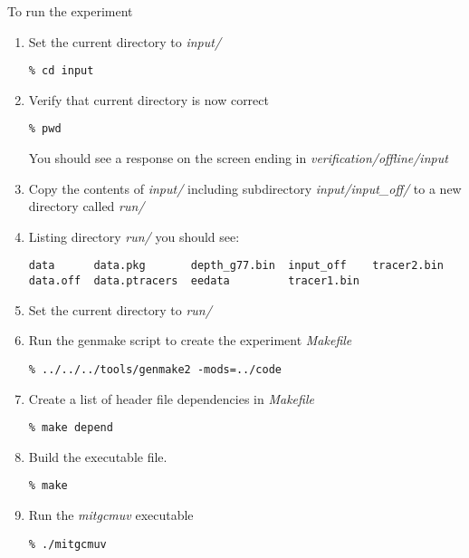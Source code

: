 To run the experiment

\begin{enumerate}
\item Set the current directory to {\it input/ }

\begin{verbatim}
% cd input
\end{verbatim}

\item Verify that current directory is now correct

\begin{verbatim}
% pwd
\end{verbatim}

  You should see a response on the screen ending in {\it
    verification/offline/input }

\item Copy the contents of {\it input/} including subdirectory {\it
    input/input\_off/} to a new directory called {\it run/}

\item Listing directory {\it run/} you should see:

\begin {verbatim}
data      data.pkg       depth_g77.bin  input_off    tracer2.bin
data.off  data.ptracers  eedata         tracer1.bin
\end{verbatim}


\item Set the current directory to {\it run/ }


\item Run the genmake script to create the experiment {\it Makefile}

\begin {verbatim}
\end{verbatim}

\item Create a list of header file dependencies in {\it Makefile}

\begin {verbatim}
\end{verbatim}

\item Build the executable file.

\begin {verbatim}
\end{verbatim}

\item Run the {\it mitgcmuv} executable

\begin {verbatim}
\end{verbatim}

\end{enumerate}

